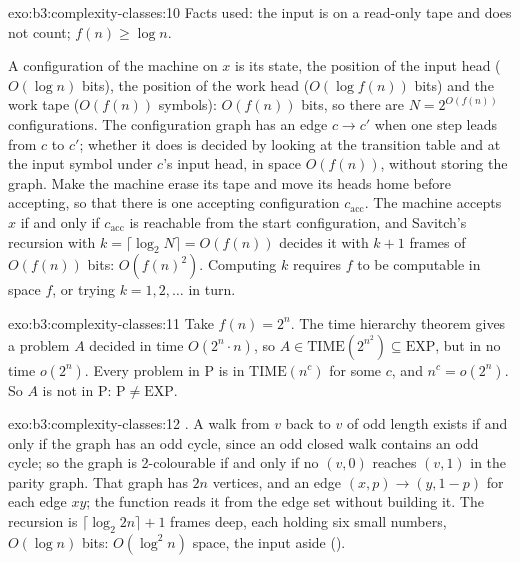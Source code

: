 \begin{solution}{exo:b3:complexity-classes:10}
Facts used: the input is on a read-only tape and does not count; $f(n) \ge \log n$.

A configuration of the machine on $x$ is its state, the position of the input head ($O(\log n)$ bits), the position of the work head ($O(\log f(n))$ bits) and the work tape ($O(f(n))$ symbols): $O(f(n))$ bits, so there are $N = 2^{O(f(n))}$ configurations. The configuration graph has an edge $c \to c'$ when one step leads from $c$ to $c'$; whether it does is decided by looking at the transition table and at the input symbol under $c$'s input head, in space $O(f(n))$, without storing the graph. Make the machine erase its tape and move its heads home before accepting, so that there is one accepting configuration $c_{\mathrm{acc}}$. The machine accepts $x$ if and only if $c_{\mathrm{acc}}$ is reachable from the start configuration, and Savitch's recursion with $k = \lceil \log_2 N \rceil = O(f(n))$ decides it with $k + 1$ frames of $O(f(n))$ bits: $O(f(n)^2)$. Computing $k$ requires $f$ to be computable in space $f$, or trying $k = 1, 2, \ldots$ in turn.
\end{solution}

\begin{solution}{exo:b3:complexity-classes:11}
Take $f(n) = 2^n$. The time hierarchy theorem gives a problem $A$ decided in time $O(2^n \cdot n)$, so $A \in \mathrm{TIME}(2^{n^2}) \subseteq \mathrm{EXP}$, but in no time $o(2^n)$. Every problem in P is in $\mathrm{TIME}(n^c)$ for some $c$, and $n^c = o(2^n)$. So $A$ is not in P: $\mathrm{P} \ne \mathrm{EXP}$.
\end{solution}

\begin{solution}{exo:b3:complexity-classes:12}
. A walk from $v$ back to $v$ of odd length exists if and only if the graph has an odd cycle, since an odd closed walk contains an odd cycle; so the graph is 2-colourable if and only if no $(v, 0)$ reaches $(v, 1)$ in the parity graph. That graph has $2n$ vertices, and an edge $(x, p) \to (y, 1 - p)$ for each edge $xy$; the function  reads it from the edge set without building it. The recursion is $\lceil \log_2 2n \rceil + 1$ frames deep, each holding six small numbers, $O(\log n)$ bits: $O(\log^2 n)$ space, the input aside ().
\end{solution}

